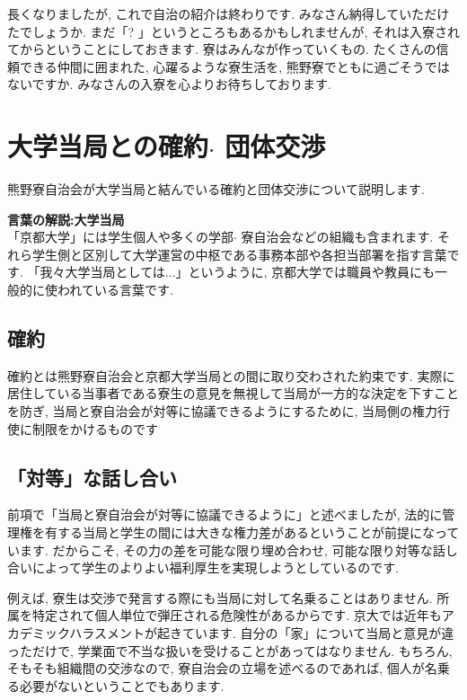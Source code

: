 \documentclass[10pt,b5jsbook,dvips,dvipdfmx,openany]{jsbook}
\theoremstyle{definition}
\begin{document}
 		長くなりましたが, これで自治の紹介は終わりです. みなさん納得していただけたでしょうか. まだ「? 」というところもあるかもしれませんが, それは入寮されてからということにしておきます. 寮はみんなが作っていくもの. たくさんの信頼できる仲間に囲まれた, 心躍るような寮生活を, 熊野寮でともに過ごそうではないですか. みなさんの入寮を心よりお待ちしております. 

\newpage %
	\section{大学当局との確約$ \cdot $ 団体交渉}
	熊野寮自治会が大学当局と結んでいる確約と団体交渉について説明します. 

	\begin{shadebox}
	\textbf{言葉の解説:大学当局} \\
	「京都大学」には学生個人や多くの学部$ \cdot $ 寮自治会などの組織も含まれます. それら学生側と区別して大学運営の中枢である事務本部や各担当部署を指す言葉です. 「我々大学当局としては...」というように, 京都大学では職員や教員にも一般的に使われている言葉です. 
	\end{shadebox}

		\subsection{確約}
		確約とは熊野寮自治会と京都大学当局との間に取り交わされた約束です. 実際に居住している当事者である寮生の意見を無視して当局が一方的な決定を下すことを防ぎ, 当局と寮自治会が対等に協議できるようにするために, 当局側の権力行使に制限をかけるものです

		\subsection{「対等」な話し合い}
 		前項で「当局と寮自治会が対等に協議できるように」と述べましたが, 法的に管理権を有する当局と学生の間には大きな権力差があるということが前提になっています. だからこそ, その力の差を可能な限り埋め合わせ, 可能な限り対等な話し合いによって学生のよりよい福利厚生を実現しようとしているのです. 
 
		例えば, 寮生は交渉で発言する際にも当局に対して名乗ることはありません. 所属を特定されて個人単位で弾圧される危険性があるからです. 京大では近年もアカデミックハラスメントが起きています. 自分の「家」について当局と意見が違っただけで, 学業面で不当な扱いを受けることがあってはなりません. 
もちろん, そもそも組織間の交渉なので, 寮自治会の立場を述べるのであれば, 個人が名乗る必要がないということでもあります. 
\end{document}
